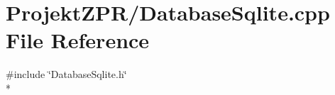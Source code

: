 \section{Projekt\-Z\-P\-R/\-Database\-Sqlite.cpp File Reference}
\label{_database_sqlite_8cpp}
{\ttfamily \#include \char`\"{}Database\-Sqlite.\-h\char`\"{}}\\*
